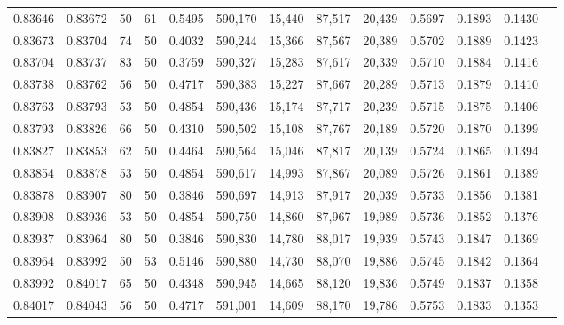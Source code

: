 \begin{tabular}{rrrrrrrrrrrrr}
0.83646 & 0.83672 &    50 &  61 &                                     0.5495 & 590,170 &  15,440 &  87,517 &  20,439 & 0.5697 & 0.1893 & 0.1430 \\
0.83673 & 0.83704 &    74 &  50 &                                     0.4032 & 590,244 &  15,366 &  87,567 &  20,389 & 0.5702 & 0.1889 & 0.1423 \\
0.83704 & 0.83737 &    83 &  50 &                                     0.3759 & 590,327 &  15,283 &  87,617 &  20,339 & 0.5710 & 0.1884 & 0.1416 \\
0.83738 & 0.83762 &    56 &  50 &                                     0.4717 & 590,383 &  15,227 &  87,667 &  20,289 & 0.5713 & 0.1879 & 0.1410 \\
0.83763 & 0.83793 &    53 &  50 &                                     0.4854 & 590,436 &  15,174 &  87,717 &  20,239 & 0.5715 & 0.1875 & 0.1406 \\
0.83793 & 0.83826 &    66 &  50 &                                     0.4310 & 590,502 &  15,108 &  87,767 &  20,189 & 0.5720 & 0.1870 & 0.1399 \\
0.83827 & 0.83853 &    62 &  50 &                                     0.4464 & 590,564 &  15,046 &  87,817 &  20,139 & 0.5724 & 0.1865 & 0.1394 \\
0.83854 & 0.83878 &    53 &  50 &                                     0.4854 & 590,617 &  14,993 &  87,867 &  20,089 & 0.5726 & 0.1861 & 0.1389 \\
0.83878 & 0.83907 &    80 &  50 &                                     0.3846 & 590,697 &  14,913 &  87,917 &  20,039 & 0.5733 & 0.1856 & 0.1381 \\
0.83908 & 0.83936 &    53 &  50 &                                     0.4854 & 590,750 &  14,860 &  87,967 &  19,989 & 0.5736 & 0.1852 & 0.1376 \\
0.83937 & 0.83964 &    80 &  50 &                                     0.3846 & 590,830 &  14,780 &  88,017 &  19,939 & 0.5743 & 0.1847 & 0.1369 \\
0.83964 & 0.83992 &    50 &  53 &                                     0.5146 & 590,880 &  14,730 &  88,070 &  19,886 & 0.5745 & 0.1842 & 0.1364 \\
0.83992 & 0.84017 &    65 &  50 &                                     0.4348 & 590,945 &  14,665 &  88,120 &  19,836 & 0.5749 & 0.1837 & 0.1358 \\
0.84017 & 0.84043 &    56 &  50 &                                     0.4717 & 591,001 &  14,609 &  88,170 &  19,786 & 0.5753 & 0.1833 & 0.1353 \\

\end{tabular}
